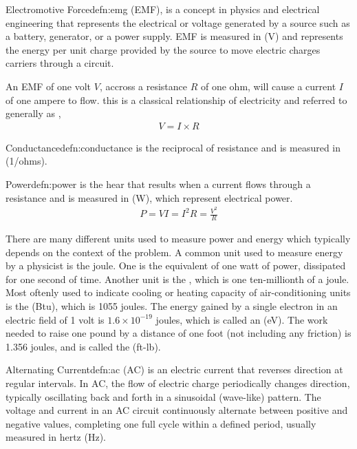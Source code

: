 \begin{defn}{Electromotive Force}{defn:emg}
 (EMF), is a concept in physics and electrical engineering that represents the electrical  or voltage generated by a source such as a battery, generator, or a power supply. EMF is measured in  (V) and represents the energy per unit charge provided by the source to move electric charges carriers through a circuit. 
\end{defn}

An EMF of one volt $V$, accross a resistance $R$ of one ohm, will cause a current $I$ of one ampere to flow. this is a classical relationship of electricity and referred to generally as ,
\begin{align}
V = I \times R
\end{align}

\begin{defn}{Conductance}{defn:conductance}
 is the reciprocal of resistance and is measured in  (1/ohms). 
\end{defn}

\begin{defn}{Power}{defn:power}
 is the hear that results when a current flows through a resistance and is measured in  (W), which represent electrical power.
\begin{align}
P = V I = I^2 R = \frac{V^2}{R}
\end{align}
\end{defn}

There are many different units used to measure power and energy which typically depends on the context of the problem. A common unit used to measure energy by a physicist is the joule. One  is the equivalent of one watt of power, dissipated for one second of time. Another unit is the , which is one ten-millionth of a joule. Most oftenly used to indicate cooling or heating capacity of air-conditioning units is the  (Btu), which is 1055 joules. The energy gained by a single electron in an electric field of 1 volt is $1.6 \times 10^{-19}$ joules, which is called an  (eV). The work needed to raise one pound by a distance of one foot (not including any friction) is 1.356 joules, and is called the  (ft-lb).

\begin{defn}{Alternating Current}{defn:ac}
 (AC) is an electric current that reverses direction at regular intervals. In AC, the flow of electric charge periodically changes direction, typically oscillating back and forth in a sinusoidal (wave-like) pattern. The voltage and current in an AC circuit continuously alternate between positive and negative values, completing one full cycle within a defined period, usually measured in hertz (Hz).
\end{defn}

